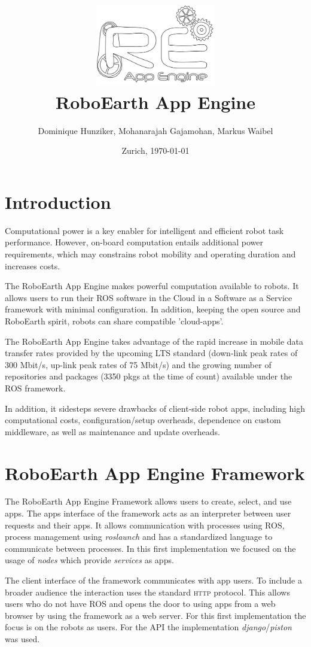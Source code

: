 \documentclass[10pt,a4paper]{article}
\title {\includegraphics[height=1.40in]{icon.pdf} \\RoboEarth App Engine }
\author {Dominique Hunziker, Mohanarajah Gajamohan, Markus Waibel}
\date{Zurich, \today}
\begin{document}
\maketitle
\section*{Introduction}

		Computational power is a key enabler for 
		intelligent and efficient robot task performance. However, on-board
		computation entails additional power requirements, which may constrains robot mobility and operating duration and increases costs.

The RoboEarth App Engine makes powerful computation available to robots. 
It allows users to run their ROS software in the Cloud in a Software as a Service framework with minimal configuration.
In addition,
		keeping the open source and RoboEarth spirit, robots can share compatible 'cloud-apps'.

The RoboEarth App Engine takes advantage of the rapid increase in mobile data transfer rates provided
		by the upcoming LTS standard (down-link peak rates of 300 Mbit/s,
		up-link peak rates of 75 Mbit/s) and the growing number of
		repositories and packages (3350 pkgs at the time of count) available
		under the ROS framework. 
				
In addition, it sidesteps severe drawbacks of client-side robot apps, including high computational costs, 
configuration/setup overheads, dependence on custom middleware, as well as maintenance and update overheads. 
		
	
	\section*{RoboEarth App Engine Framework}
		The RoboEarth App Engine Framework allows users to create, select, and use apps.
		The apps interface of the framework acts as an interpreter between user
		requests and their apps. It allows 
communication with processes using \textsc{ROS}, process management
		using \emph{roslaunch} and has a standardized language to communicate between
		processes. In this first implementation we focused on the usage of \emph{nodes} which provide
		\emph{services} as apps.
		
		The client interface of the framework communicates with app users. 
To include a broader audience the interaction uses the standard \textsc{http} protocol.
		This allows users who do not have \textsc{ROS} and opens the door to using apps from
		a web browser by using the framework as a web server. For this first
		implementation the focus is on the robots as users. For the API 
		the implementation \emph{django}/\emph{piston} was used.
	
\end{document}
